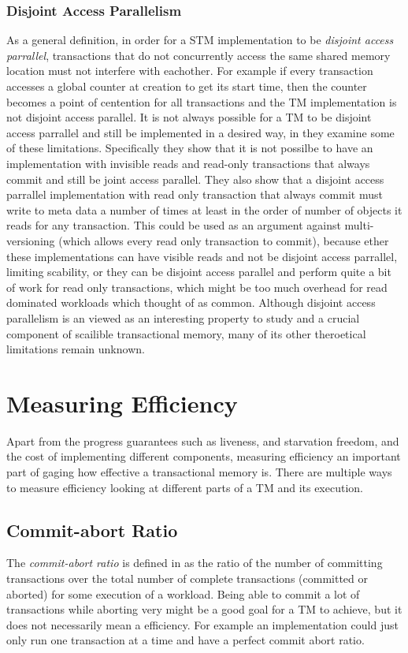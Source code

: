 \subsubsection{Disjoint Access Parallelism}
As a general definition, in order for a STM implementation to be \emph{disjoint access parrallel}, transactions that do not concurrently access the same shared memory location must not interfere with eachother.
For example if every transaction accesses a global counter at creation to get its start time, then the counter becomes a point of centention for all transactions and the TM implementation is not disjoint access parallel.
It is not always possible for a TM to be disjoint access parrallel and still be implemented in a desired way, in \cite{1584015} they examine some of these limitations.
Specifically they show that it is not possilbe to have an implementation with invisible reads and read-only transactions that always commit and still be joint access parallel.
They also show that a disjoint access parrallel implementation with read only transaction that always commit must write to meta data a number of times at least in the order of number of objects it reads for any transaction.
This could be used as an argument against multi-versioning (which allows every read only transaction to commit), because ether these implementations can have visible reads and not be disjoint access parrallel, limiting scability, or they can be disjoint access parallel and perform quite a bit of work for read only transactions, which might be too much overhead for read dominated workloads which thought of as common.
Although disjoint access parallelism is an viewed as an interesting property to study and a crucial component of scailible transactional memory, many of its other theroetical limitations remain unknown.

\section{Measuring Efficiency}
Apart from the progress guarantees such as liveness, and starvation freedom, and the cost of implementing different components, measuring efficiency an important part of gaging how effective a transactional memory is.
There are multiple ways to measure efficiency looking at different parts of a TM and its execution.

\subsection{Commit-abort Ratio}
The \emph{commit-abort ratio} is defined in \cite{LPD-ARTICLE-2009-004} as the ratio of the number of committing transactions over the total number of complete transactions (committed or aborted) for some execution of a workload.
Being able to commit a lot of transactions while aborting very might be a good goal for a TM to achieve, but it does not necessarily mean a efficiency.  For example an implementation could just only run one transaction at a time and have a perfect commit abort ratio.

